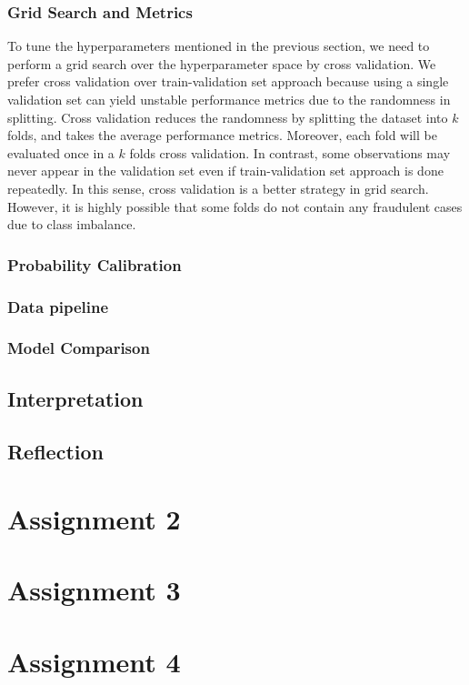 \documentclass[12pt]{article}
\begin{document}
\subsubsection*{Grid Search and Metrics}

To tune the hyperparameters mentioned in the previous section, we need to perform a grid search over the hyperparameter space by cross validation. We prefer cross validation over train-validation set approach because using a single validation set can yield unstable performance metrics due to the randomness in splitting. Cross validation reduces the randomness by splitting the dataset into $k$ folds, and takes the average performance metrics. Moreover, each fold will be evaluated once in a $k$ folds cross validation. In contrast, some observations may never appear in the validation set even if train-validation set approach is done repeatedly. In this sense, cross validation is a better strategy in grid search.\\

However, it is highly possible that some folds do not contain any fraudulent cases due to class imbalance. 

\subsubsection*{Probability Calibration}



\subsubsection*{Data pipeline}

\subsubsection*{Model Comparison}


\subsection*{Interpretation}

\subsection*{Reflection}

\clearpage
\section*{Assignment 2}

\clearpage
\section*{Assignment 3}

\clearpage
\section*{Assignment 4}
\end{document}
